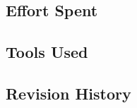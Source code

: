 \subsection{Effort Spent}
\label{sect:appendix:effortspent}


\subsection{Tools Used}
\label{sect:appendix:tools}


\subsection{Revision History}
\label{sect:appendix:revhistory}
